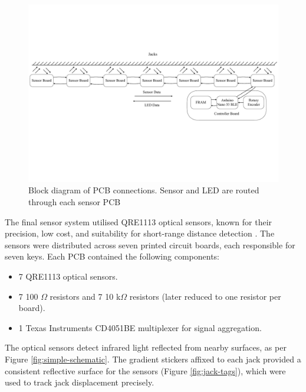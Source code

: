 \begin{figure}
    \centering
    \includegraphics[width=\linewidth]{src/images/block-diagram.pdf}
    \caption{Block diagram of PCB connections. Sensor and LED are routed through each sensor PCB}
    \label{fig:system-block-diagram}
\end{figure}

The final sensor system utilised QRE1113 optical sensors, known for their precision, low cost, and suitability for short-range distance detection \cite{McPherson2013, McPherson2019}. The sensors were distributed across seven printed circuit boards, each responsible for seven keys. Each PCB contained the following components:

\begin{itemize}
    \item 7 QRE1113 optical sensors.
    \item 7 100 $\Omega$ resistors and 7 10 k$\Omega$ resistors (later reduced to one resistor per board).
    \item 1 Texas Instruments CD4051BE multiplexer for signal aggregation.
\end{itemize}

The optical sensors detect infrared light reflected from nearby surfaces, as per Figure \ref{fig:simple-schematic}. The gradient stickers affixed to each jack provided a consistent reflective surface for the sensors (Figure \ref{fig:jack-tags}), which were used to track jack displacement precisely. 


